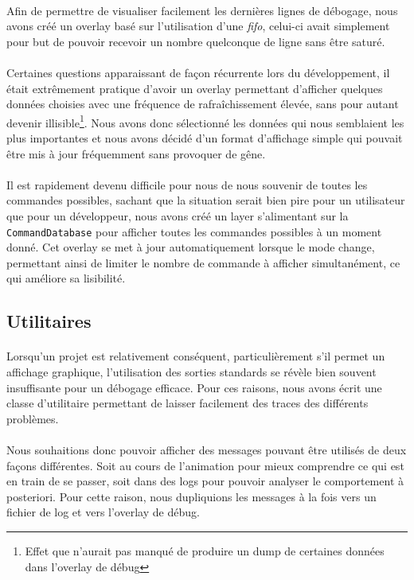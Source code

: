 \paragraph{}
Afin de permettre de visualiser facilement les dernières lignes de débogage,
nous avons créé un overlay basé sur l'utilisation d'une {\em fifo}, celui-ci
avait simplement pour but de pouvoir recevoir un nombre quelconque de ligne
sans être saturé.

\paragraph{}
Certaines questions apparaissant de façon récurrente lors du développement,
il était extrêmement pratique d'avoir un overlay permettant d'afficher
quelques données choisies avec une fréquence de rafraîchissement élevée, sans
pour autant devenir illisible\footnote{Effet que n'aurait pas manqué de
produire un dump de certaines données dans l'overlay de débug}. Nous avons
donc sélectionné les données qui nous semblaient les plus importantes et
nous avons décidé d'un format d'affichage simple qui pouvait être mis à jour
fréquemment sans provoquer de gêne.

\paragraph{}
Il est rapidement devenu difficile pour nous de nous souvenir de toutes les
commandes possibles, sachant que la situation serait bien pire pour un
utilisateur que pour un développeur, nous avons créé un layer s'alimentant
sur la \verb!CommandDatabase! pour afficher toutes les commandes possibles
à un moment donné. Cet overlay se met à jour automatiquement lorsque le mode
change, permettant ainsi de limiter le nombre de commande à afficher
simultanément, ce qui améliore sa lisibilité.


\subsection{Utilitaires}
\paragraph{}
Lorsqu'un projet est relativement conséquent, particulièrement s'il permet un
affichage graphique, l'utilisation des sorties standards se révèle bien
souvent insuffisante pour un débogage efficace. Pour ces raisons, nous avons
écrit une classe d'utilitaire permettant de laisser facilement des traces des
différents problèmes.

\paragraph{}
Nous souhaitions donc pouvoir afficher des messages pouvant être utilisés de
deux façons différentes. Soit au cours de l'animation pour mieux comprendre
ce qui est en train de se passer, soit dans des logs pour pouvoir analyser le
comportement à posteriori. Pour cette raison, nous dupliquions les messages à
la fois vers un fichier de log et vers l'overlay de débug.
